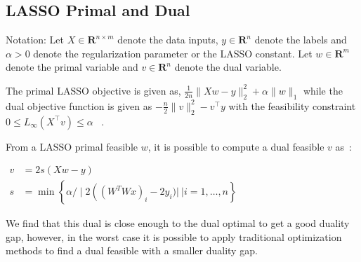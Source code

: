 \subsection{LASSO Primal and Dual}\label{app:subsec:lassoprimaldual}

Notation: Let $X \in \mathbf{R}^{n\times m}$ denote the data inputs, $y \in \mathbf{R}^n$ denote the labels and $\alpha > 0$ denote the regularization parameter or the LASSO constant. Let $w \in \mathbf{R}^m$ denote the primal variable and $v \in \mathbf{R}^n$ denote the dual variable.

The primal LASSO objective is given as, $\frac{1}{2 n}\|Xw-y\|_2^2+\alpha\|w\|_1$  while the dual objective function is given as $-\frac{n}{2}\|v\|_2^2-v^{\top} y$ with the feasibility constraint $0 \leq L_{\infty}\left(X^{\top} v\right) \leq \alpha$ ~\cite{lassodualfromfeasible}.


From a LASSO primal feasible $w$, it is possible to compute a dual feasible $v$ as~\cite{lassodualfromfeasible}:

$\begin{aligned}
v & =2 s(Xw-y) \\
s & =\min \left\{\alpha / \mid 2\left(\left(W^T W x\right)_i-2 y_i)| ~| i=1, \ldots, n\right\}\right.\end{aligned}$


We find that this dual is close enough to the dual optimal to get a good duality gap, however, in the worst case it is possible to apply traditional optimization methods to find a dual feasible with a smaller duality gap.